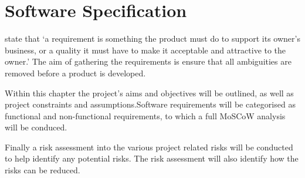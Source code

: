 \chapter{Software Specification} 
\label{chap:requirements} 

\citet{robertson13} state that `a requirement is something the product must 
do to support its owner's business, or a quality it must have to make it 
acceptable and attractive to the owner.' The aim of gathering the requirements 
is ensure that all ambiguities are removed before a product is developed.

Within this chapter the project's aims and objectives will be outlined, as well 
as project constraints and assumptions.Software requirements will be categorised
as functional and non-functional requirements, to which a full MoSCoW analysis 
will be conduced.

Finally a risk assessment into the various project related risks will be 
conducted to help identify any potential risks. The risk assessment will also 
identify how the risks can be reduced.


\newpage


\newpage


\newpage


\newpage


\newpage


\newpage


\newpage 


\newpage


